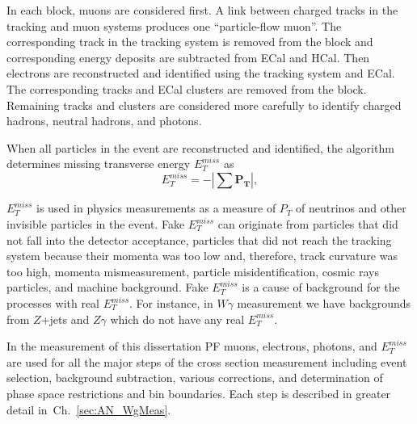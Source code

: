In each block, muons are considered first. A link between charged tracks in the tracking and muon systems produces one ``particle-flow muon''. The corresponding track in the tracking system is removed from the block and corresponding energy deposits are subtracted from ECal and HCal. Then electrons are reconstructed and identified using the tracking system and ECal. The corresponding tracks and ECal clusters are removed from the block. Remaining tracks and clusters are considered more carefully to identify charged hadrons, neutral hadrons, and photons.

When all particles in the event are reconstructed and identified, the algorithm determines missing transverse energy $E_T^{miss}$ as 
\begin{equation}\label{eq:MET}
  E_T^{miss} = - | \sum \mathbf{P_T} |,
\end{equation}

$E_T^{miss}$ is used in physics measurements as a measure of $P_T$ of neutrinos and other invisible particles in the event. Fake $E_T^{miss}$ can originate from particles that did not fall into the detector acceptance, particles that did not reach the tracking system because their momenta was too low and, therefore, track curvature was too high, momenta mismeasurement, particle misidentification, cosmic rays particles, and machine background. Fake $E_T^{miss}$ is a cause of background for the processes with real $E_T^{miss}$. For instance, in $W\gamma$ measurement we have backgrounds from $Z$+jets and $Z\gamma$ which do not have any real $E_T^{miss}$.

In the measurement of this dissertation PF muons, electrons, photons, and $E_T^{miss}$ are used for all the major steps of the cross section measurement including event selection, background subtraction, various corrections, and determination of phase space restrictions and bin boundaries. Each step is described in greater detail in~Ch.~\ref{sec:AN_WgMeas}. 


